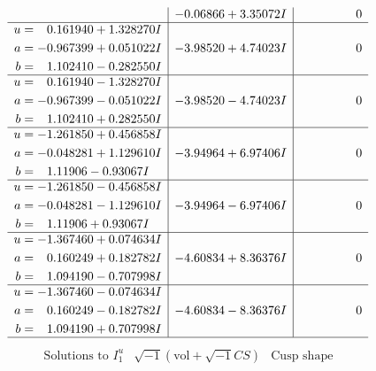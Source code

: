 \documentclass[1p]{elsarticle_modified}
\theoremstyle{definition}
\newcommand{\I}{\sqrt{-1}}
\begin{document}
$$\begin{array}{c|c|c}
 & -0.06866 + 3.35072 I & \phantom{-0.000000 } 0 \\ \hline\begin{aligned}
u &= \phantom{-}0.161940 + 1.328270 I \\
a &= -0.967399 + 0.051022 I \\
b &= \phantom{-}1.102410 - 0.282550 I\end{aligned}
 & -3.98520 + 4.74023 I & \phantom{-0.000000 } 0 \\ \hline\begin{aligned}
u &= \phantom{-}0.161940 - 1.328270 I \\
a &= -0.967399 - 0.051022 I \\
b &= \phantom{-}1.102410 + 0.282550 I\end{aligned}
 & -3.98520 - 4.74023 I & \phantom{-0.000000 } 0 \\ \hline\begin{aligned}
u &= -1.261850 + 0.456858 I \\
a &= -0.048281 + 1.129610 I \\
b &= \phantom{-}1.11906 - 0.93067 I\end{aligned}
 & -3.94964 + 6.97406 I & \phantom{-0.000000 } 0 \\ \hline\begin{aligned}
u &= -1.261850 - 0.456858 I \\
a &= -0.048281 - 1.129610 I \\
b &= \phantom{-}1.11906 + 0.93067 I\end{aligned}
 & -3.94964 - 6.97406 I & \phantom{-0.000000 } 0 \\ \hline\begin{aligned}
u &= -1.367460 + 0.074634 I \\
a &= \phantom{-}0.160249 + 0.182782 I \\
b &= \phantom{-}1.094190 - 0.707998 I\end{aligned}
 & -4.60834 + 8.36376 I & \phantom{-0.000000 } 0 \\ \hline\begin{aligned}
u &= -1.367460 - 0.074634 I \\
a &= \phantom{-}0.160249 - 0.182782 I \\
b &= \phantom{-}1.094190 + 0.707998 I\end{aligned}
 & -4.60834 - 8.36376 I & \phantom{-0.000000 } 0\\
 \hline 
 \end{array}$$\newpage$$\begin{array}{c|c|c}  
\text{Solutions to }I^u_{1}& \I (\text{vol} + \sqrt{-1}CS) & \text{Cusp shape}\\

\end{array}$$
\end{document}
